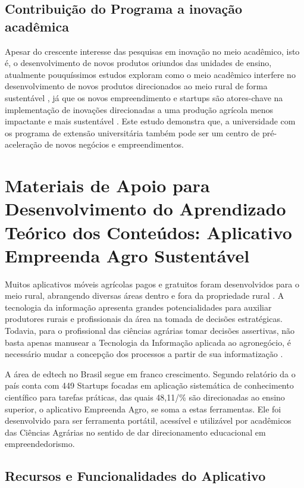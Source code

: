 \subsection{Contribuição do Programa a inovação acadêmica}


Apesar do crescente interesse das pesquisas em inovação no meio acadêmico, isto é, o desenvolvimento de novos produtos oriundos das unidades de ensino, atualmente pouquíssimos estudos exploram como o meio acadêmico interfere no desenvolvimento de novos produtos direcionados ao meio rural de forma sustentável \cite{liu_new_2020}, já que os novos empreendimento e startups são atores-chave na implementação de inovações direcionadas a uma produção agrícola menos impactante e mais sustentável \cite{fichter_impacts_2020}. Este estudo demonstra que, a universidade com os programa de extensão universitária também pode ser um centro de pré-aceleração de novos negócios e  empreendimentos. 


\section{Materiais de Apoio para Desenvolvimento do Aprendizado Teórico dos Conteúdos: Aplicativo Empreenda Agro Sustentável}

Muitos aplicativos móveis agrícolas pagos e gratuitos foram desenvolvidos para o meio rural, abrangendo diversas áreas dentro e fora da propriedade rural \cite{silva_environment_2015}. A tecnologia da informação apresenta grandes potencialidades para auxiliar produtores rurais e profissionais da área na tomada de decisões estratégicas. Todavia, para o profissional das ciências agrárias tomar decisões assertivas, não basta apenas manusear a Tecnologia da Informação aplicada ao agronegócio, é necessário mudar a concepção dos processos a partir de sua informatização \cite{ferraz_tecnologia_2017}.

A área de edtech no Brasil segue em franco crescimento. Segundo relatório da  o país conta com 449 Startups focadas em aplicação sistemática de conhecimento científico para tarefas práticas, das quais 48,11/\% são direcionadas ao ensino superior, o aplicativo Empreenda Agro, se soma a estas ferramentas. Ele foi desenvolvido para ser ferramenta portátil, acessível e utilizável por acadêmicos das Ciências Agrárias no sentido de dar direcionamento educacional em empreendedorismo.

\subsection{Recursos e Funcionalidades do Aplicativo}

